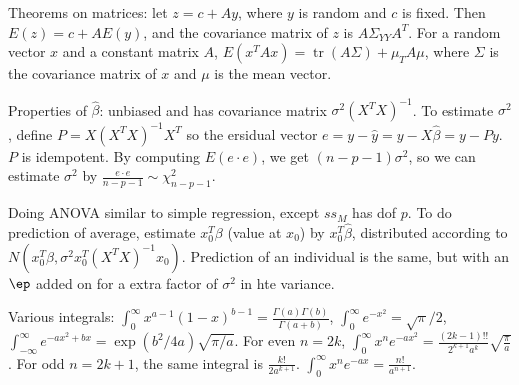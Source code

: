 \documentclass{article}
\DeclareMathOperator{\tr}{tr}
\begin{document}
Theorems on matrices: let $z=c+Ay$, where $y$ is random and $c$ is fixed. Then $E(z)=c+AE(y)$, and the covariance matrix of $z$ is $A\Sigma_{YY}A^T$. For a random vector $x$ and a constant matrix $A$, $E(x^TAx)=\tr(A\Sigma)+\mu_TA\mu$, where $\Sigma$ is the covariance matrix of $x$ and $\mu$ is the mean vector. 

Properties of $\widehat{\beta}$: unbiased and has covariance matrix $\sigma^2(X^TX)^{-1}$. To estimate $\sigma^2$, define $P=X(X^TX)^{-1}X^T$ so the ersidual vector $e=y-\hat{y}=y-X\hat{\beta}=y-Py$. $P$ is idempotent. By computing $E(e\cdot e)$, we get $(n-p-1)\sigma^2$, so we can estimate $\sigma^2$ by $\frac{e\cdot e}{n-p-1}\sim\chi^2_{n-p-1}$. 

Doing ANOVA similar to simple regression, except $ss_M$ has dof $p$. To do prediction of average, estimate $x_0^T\beta$ (value at $x_0$) by $x_0^T\hat{\beta}$, distributed according to $N(x_0^T\beta,\sigma^2x_0^T(X^TX)^{-1}x_0)$. Prediction of an individual is the same, but with an $\ep$ added on for a extra factor of $\sigma^2$ in hte variance.

Various integrals: $\int_0^\infty x^{a-1}(1-x)^{b-1}=\frac{\Gamma(a)\Gamma(b)}{\Gamma(a+b)}$, $\int_0^\infty e^{-x^2}=\sqrt{\pi}/2$, $\int_{-\infty}^\infty e^{-ax^2+bx}=\exp(b^2/4a)\sqrt{\pi/a}$. For even $n=2k$, $\int_0^\infty x^ne^{-ax^2}=\frac{(2k-1)!!}{2^{k+1}a^k}\sqrt{\frac{\pi}{a}}$. For odd $n=2k+1$, the same integral is $\frac{k!}{2a^{k+1}}$. $\int_0^\infty x^ne^{-ax}=\frac{n!}{a^{n+1}}$. 
\end{document}

